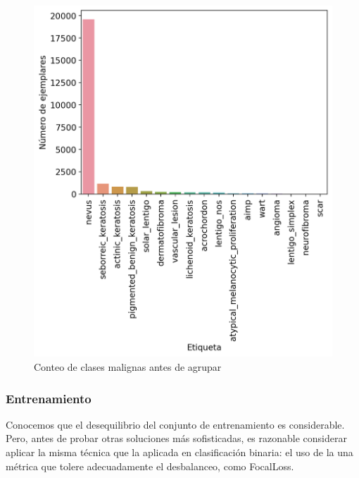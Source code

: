 \begin{figure}[H]
	\centering
	\includegraphics[scale = 0.6]{imagenes/countbenign.png}
	\caption{Conteo de clases malignas antes de agrupar}
	\label {fig:buenas}
\end{figure}

\subsubsection{Entrenamiento}

Conocemos que el desequilibrio del conjunto de entrenamiento es considerable. Pero, antes de probar otras soluciones más sofisticadas, es razonable considerar aplicar la misma técnica que la aplicada en clasificación binaria: el uso de la una métrica que tolere adecuadamente el desbalanceo, como FocalLoss.\\

